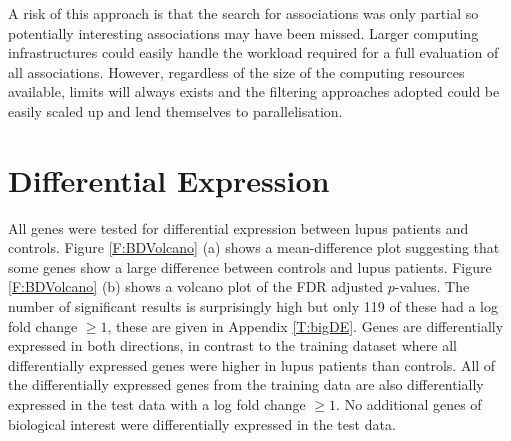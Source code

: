\documentclass[a4paper, 12pt]{report}
\begin{document}
A risk of this approach is that the search for associations was only partial so potentially interesting associations may have been missed. Larger computing infrastructures could easily handle the workload required for a full evaluation of all associations. However, regardless of the size of the computing resources available, limits will always exists and the filtering approaches adopted could be easily scaled up and lend themselves to parallelisation.


\section{Differential Expression}
All genes were tested for differential expression between lupus patients and controls. Figure \ref{F:BDVolcano} (a) shows a mean-difference plot suggesting that some genes show a large difference between controls and lupus patients. Figure \ref{F:BDVolcano} (b) shows a volcano plot of the FDR adjusted $p$-values. The number of significant results is surprisingly high but only 119 of these had a log fold change $\ge 1$, these are given in Appendix \ref{T:bigDE}. Genes are differentially expressed in both directions, in contrast to the training dataset where all differentially expressed genes were higher in lupus patients than controls. All of the differentially expressed genes from the training data are also differentially expressed in the test data with a log fold change $\ge 1$. No additional genes of biological interest were differentially expressed in the test data. 
\end{document}
